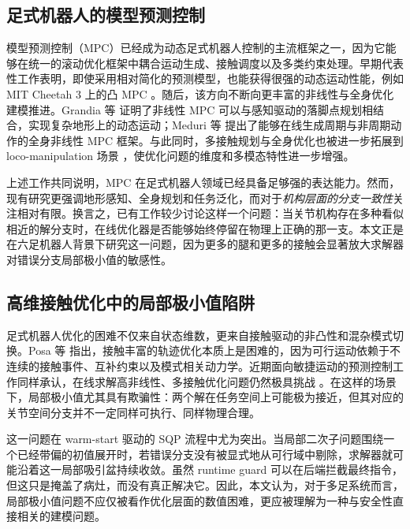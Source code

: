 \label{sec:related_work}

\subsection{足式机器人的模型预测控制}

模型预测控制（MPC）已经成为动态足式机器人控制的主流框架之一，因为它能够在统一的滚动优化框架中耦合运动生成、接触调度以及多类约束处理。早期代表性工作表明，即使采用相对简化的预测模型，也能获得很强的动态运动性能，例如 MIT Cheetah 3 上的凸 MPC \cite{dicarlo2018convexmpc}。随后，该方向不断向更丰富的非线性与全身优化建模推进。Grandia 等 \cite{grandia2023perceptive} 证明了非线性 MPC 可以与感知驱动的落脚点规划相结合，实现复杂地形上的动态运动；Meduri 等 \cite{meduri2022biconmp} 提出了能够在线生成周期与非周期动作的全身非线性 MPC 框架。与此同时，多接触规划与全身优化也被进一步拓展到 loco-manipulation 场景 \cite{sleiman2023versatile}，使优化问题的维度和多模态特性进一步增强。

上述工作共同说明，MPC 在足式机器人领域已经具备足够强的表达能力。然而，现有研究更强调地形感知、全身规划和任务泛化，而对于\emph{机构层面的分支一致性}关注相对有限。换言之，已有工作较少讨论这样一个问题：当关节机构存在多种看似相近的解分支时，在线优化器是否能够始终停留在物理上正确的那一支。本文正是在六足机器人背景下研究这一问题，因为更多的腿和更多的接触会显著放大求解器对错误分支局部极小值的敏感性。

\subsection{高维接触优化中的局部极小值陷阱}

足式机器人优化的困难不仅来自状态维数，更来自接触驱动的非凸性和混杂模式切换。Posa 等 \cite{posa2014direct} 指出，接触丰富的轨迹优化本质上是困难的，因为可行运动依赖于不连续的接触事件、互补约束以及模式相关动力学。近期面向敏捷运动的预测控制工作同样承认，在线求解高非线性、多接触优化问题仍然极具挑战 \cite{mastalli2022agile}。在这样的场景下，局部极小值尤其具有欺骗性：两个解在任务空间上可能极为接近，但其对应的关节空间分支并不一定同样可执行、同样物理合理。

这一问题在 warm-start 驱动的 SQP 流程中尤为突出。当局部二次子问题围绕一个已经带偏的初值展开时，若错误分支没有被显式地从可行域中剔除，求解器就可能沿着这一局部吸引盆持续收敛。虽然 runtime guard 可以在后端拦截最终指令，但这只是掩盖了病灶，而没有真正解决它。因此，本文认为，对于多足系统而言，局部极小值问题不应仅被看作优化层面的数值困难，更应被理解为一种与安全性直接相关的建模问题。

